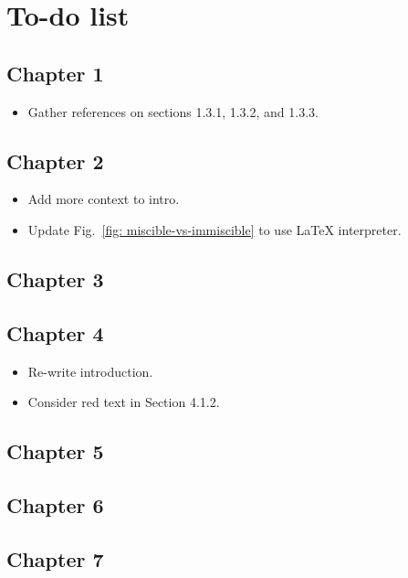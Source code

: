 \section{To-do list}

\subsection{Chapter 1}
\begin{itemize}
    \item Gather references on sections 1.3.1, 1.3.2, and 1.3.3.
\end{itemize}

\subsection{Chapter 2}
\begin{itemize}
    \item Add more context to intro.
    \item Update Fig.~\ref{fig: miscible-vs-immiscible} to use \LaTeX
          interpreter.
\end{itemize}

\subsection{Chapter 3}

\subsection{Chapter 4}
\begin{itemize}
    \item Re-write introduction.
    \item Consider red text in Section 4.1.2.
\end{itemize}
\subsection{Chapter 5}
\subsection{Chapter 6}
\subsection{Chapter 7}
